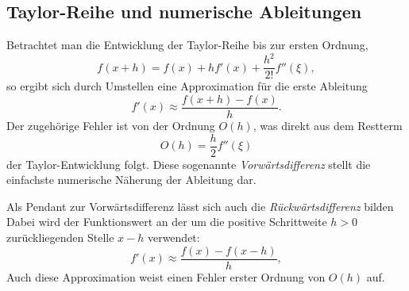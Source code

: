 \subsection{Taylor-Reihe und numerische Ableitungen}

Betrachtet man die Entwicklung der Taylor-Reihe bis zur ersten Ordnung,
\begin{equation*}
	f(x+h) = f(x) + h f'(x) + \frac{h^2}{2!}f''(\xi),
\end{equation*}
so ergibt sich durch Umstellen eine Approximation für die erste Ableitung
\begin{equation}
	f'(x) \approx \frac{f(x+h) - f(x)}{h}.
	\label{step:finitdiff}
\end{equation}
Der zugehörige Fehler ist von der Ordnung $O(h)$, was direkt 
aus dem Restterm
\begin{equation*}
	O(h) = \frac{h}{2}f''(\xi)
\end{equation*}
der Taylor-Entwicklung folgt.
Diese sogenannte \emph{Vorwärtsdifferenz} stellt die einfachste numerische Näherung der 
%
Ableitung dar.

Als Pendant zur Vorwärtsdifferenz lässt sich auch die \emph{Rückwärtsdifferenz} bilden
%
Dabei wird der Funktionswert an der um die positive Schrittweite $h>0$ zurückliegenden Stelle $x-h$ verwendet:
\begin{equation*}
	f'\left(x\right) \approx \frac{f\left(x\right) - f\left(x-h\right)}{h},
	\label{step:diffmethod}
\end{equation*}
Auch diese Approximation weist einen Fehler erster Ordnung von $O(h)$ auf.

